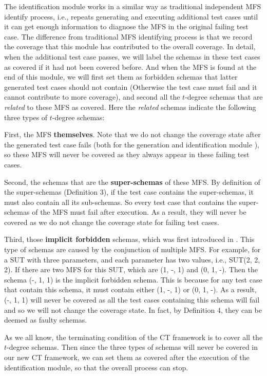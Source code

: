 \documentclass{sig-alternate}
\begin{document}
The identification module works in a similar way as traditional independent MFS identify process, i.e., repeats generating and executing additional test cases until it can get enough information to diagnose the MFS in the original failing test case. The difference from traditional MFS identifying process is that we record the coverage that this module has contributed to the overall coverage. In detail, when the additional test case passes, we will label the schemas in these test cases as covered if it had not been covered before. And when the MFS is found at the end of this module, we will first set them as forbidden schemas that latter generated test cases should not contain (Otherwise the test case must fail and it cannot contribute to more coverage), and second all the $t$-degree schemas that are \emph{related} to these MFS as covered. Here the \emph{related} schemas indicate the following three types of $t$-degree schemas:

First, the MFS \textbf{themselves}. Note that we do not change the coverage state after the generated test case fails (both for the generation and identification module ), so these MFS will never be covered as they always appear in these failing test cases.

Second, the schemas that are the \textbf{super-schemas} of these MFS. By definition of the super-schemas (Definition 3), if the test case contains the super-schemas, it must also contain all its sub-schemas. So every test case that contains the super-schemas of the MFS must fail after execution. As a result, they will never be covered as we do not change the coverage state for failing test cases.

Third, those \textbf{implicit forbidden} schemas, which was first introduced in \cite{cohen2007interaction}.  This type of schemas are caused by the conjunction of multiple MFS. For example, for a SUT with three parameters, and each parameter has two values, i.e., SUT(2, 2, 2). If there are two MFS for this SUT, which are (1, -, 1) and (0, 1, -). Then the schema (-, 1, 1) is the implicit forbidden schema. This is because for any test case that contain this schema, it must contain either (1, -, 1) or (0, 1, -). As a result, (-, 1, 1) will never be covered as all the test cases containing this schema will fail and so we will not change the coverage state. In fact, by Definition 4, they can be deemed as faulty schemas.

As we all know, the terminating condition of the CT framework is to cover all the $t$-degree schemas. Then since the three types of schemas will never be covered in our new CT framework, we can set them as covered after the execution of the identification module, so that the overall process can stop.
\end{document}
